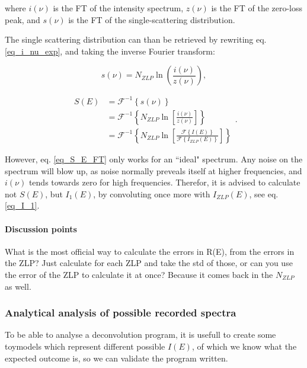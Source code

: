 where $i(\nu)$ is the FT of the intensity spectrum, $z(\nu)$ is the FT of the zero-loss peak, and $s(\nu)$ is the FT of the single-scattering distribution.


The single scattering distribution can than be retrieved by rewriting eq. \eqref{eq_i_nu_exp}, and taking the inverse Fourier transform:

\begin{equation}
    s(\nu) = N_{ZLP} \operatorname{ln}\left(\frac{i(\nu)}{z(\nu)}\right),
\end{equation}

\begin{equation}\label{eq_S_E_FT}
    \begin{aligned}
    S(E) &= \mathcal{F}^{-1}\left\{s(\nu)\right\} \\
    &= \mathcal{F}^{-1}\left\{N_{ZLP}\operatorname{ln}\left[\frac{i(\nu)}{z(\nu)}\right]\right\} \\
    &= \mathcal{F}^{-1}\left\{N_{ZLP}\operatorname{ln}\left[\frac{\mathcal{F}\left\{I(E)\right\}}{\mathcal{F}\left\{I_{ZLP}(E)\right\}}\right]\right\}
    \end{aligned}.
\end{equation}


However, eq. \eqref{eq_S_E_FT} only works for an ``ideal" spectrum. Any noise on the spectrum will blow up, as noise normally preveals itself at higher frequencies, and $i(\nu)$ tends towards zero for high frequencies. Therefor, it is advised to calculate not $S(E)$, but $I_1(E)$, by convoluting once more with $I_{ZLP}(E)$, see eq. \eqref{eq_I_1}. \cite{egerton_book}




\paragraph{Discussion points} What is the most official way to calculate the errors in R(E), from the errors in the ZLP? Just calculate for each ZLP and take the std of those, or can you use the error of the ZLP to calculate it at once? Because it comes back in the $N_{ZLP}$ as well.



\subsubsection{Analytical analysis of possible recorded spectra}
To be able to analyse a deconvolution program, it is usefull to create some toymodels which represent different possible $I(E)$, of which we know what the expected outcome is, so we can validate the program written.


